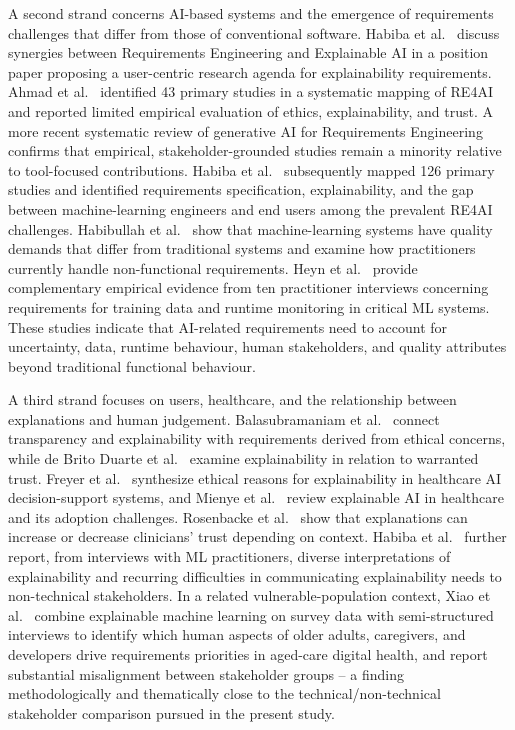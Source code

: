 \documentclass[pdflatex,sn-mathphys-num,Numbered]{sn-jnl}
\begin{document}
A second strand concerns AI-based systems and the emergence of requirements challenges that differ from those of conventional software. Habiba et al.~\cite{habiba2022} discuss synergies between Requirements Engineering and Explainable AI in a position paper proposing a user-centric research agenda for explainability requirements. Ahmad et al.~\cite{ahmad2023} identified 43 primary studies in a systematic mapping of RE4AI and reported limited empirical evaluation of ethics, explainability, and trust. A more recent systematic review of generative AI for Requirements Engineering~\cite{cheng2026} confirms that empirical, stakeholder-grounded studies remain a minority relative to tool-focused contributions. Habiba et al.~\cite{habiba2024} subsequently mapped 126 primary studies and identified requirements specification, explainability, and the gap between machine-learning engineers and end users among the prevalent RE4AI challenges. Habibullah et al.~\cite{habibullah2023} show that machine-learning systems have quality demands that differ from traditional systems and examine how practitioners currently handle non-functional requirements. Heyn et al.~\cite{heyn2024} provide complementary empirical evidence from ten practitioner interviews concerning requirements for training data and runtime monitoring in critical ML systems. These studies indicate that AI-related requirements need to account for uncertainty, data, runtime behaviour, human stakeholders, and quality attributes beyond traditional functional behaviour.

A third strand focuses on users, healthcare, and the relationship between explanations and human judgement. Balasubramaniam et al.~\cite{balasubramaniam2023} connect transparency and explainability with requirements derived from ethical concerns, while de Brito Duarte et al.~\cite{debritoduarte2023} examine explainability in relation to warranted trust. Freyer et al.~\cite{freyer2024} synthesize ethical reasons for explainability in healthcare AI decision-support systems, and Mienye et al.~\cite{mienye2024} review explainable AI in healthcare and its adoption challenges. Rosenbacke et al.~\cite{rosenbacke2024} show that explanations can increase or decrease clinicians' trust depending on context. Habiba et al.~\cite{habiba2025} further report, from interviews with ML practitioners, diverse interpretations of explainability and recurring difficulties in communicating explainability needs to non-technical stakeholders. In a related vulnerable-population context, Xiao et al.~\cite{xiao2026} combine explainable machine learning on survey data with semi-structured interviews to identify which human aspects of older adults, caregivers, and developers drive requirements priorities in aged-care digital health, and report substantial misalignment between stakeholder groups -- a finding methodologically and thematically close to the technical/non-technical stakeholder comparison pursued in the present study.
\end{document}
